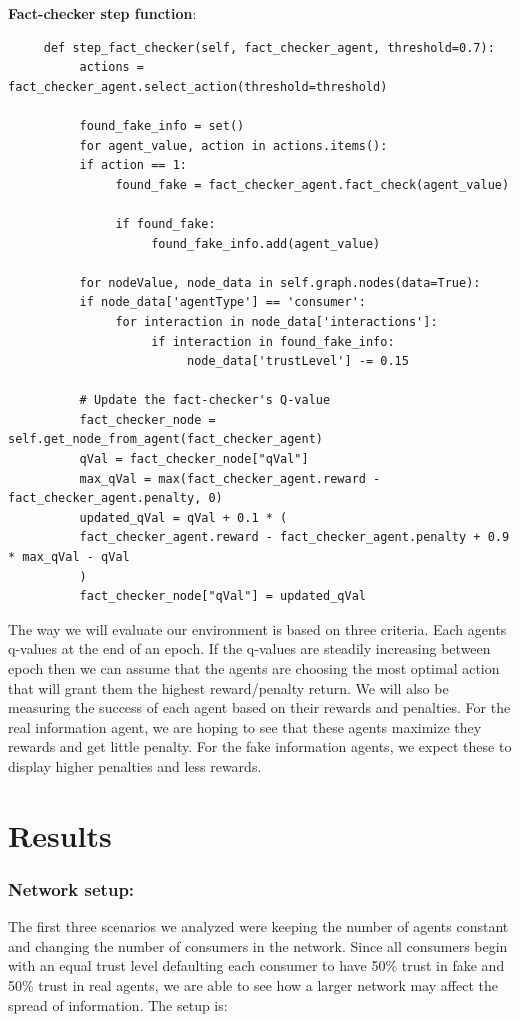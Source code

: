 \documentclass[twoside]{article}
\begin{document}
\textbf{Fact-checker step function}:

\begin{verbatim}
     def step_fact_checker(self, fact_checker_agent, threshold=0.7):
          actions = fact_checker_agent.select_action(threshold=threshold)

          found_fake_info = set()
          for agent_value, action in actions.items():
          if action == 1:
               found_fake = fact_checker_agent.fact_check(agent_value)
               
               if found_fake:
                    found_fake_info.add(agent_value)
          
          for nodeValue, node_data in self.graph.nodes(data=True):
          if node_data['agentType'] == 'consumer':
               for interaction in node_data['interactions']:
                    if interaction in found_fake_info:
                         node_data['trustLevel'] -= 0.15

          # Update the fact-checker's Q-value
          fact_checker_node = self.get_node_from_agent(fact_checker_agent)
          qVal = fact_checker_node["qVal"]
          max_qVal = max(fact_checker_agent.reward - fact_checker_agent.penalty, 0)
          updated_qVal = qVal + 0.1 * (
          fact_checker_agent.reward - fact_checker_agent.penalty + 0.9 * max_qVal - qVal
          )
          fact_checker_node["qVal"] = updated_qVal
\end{verbatim}

The way we will evaluate our environment is based on three criteria. Each agents q-values at the end of an epoch. If the q-values are steadily increasing between epoch then we can assume that the agents are choosing the most optimal action that will grant them the highest reward/penalty return. We will also be measuring the success of each agent based on their rewards and penalties. For the real information agent, we are hoping to see that these agents maximize they rewards and get little penalty. For the fake information agents, we expect these to display higher penalties and less rewards.


\section{Results}
\subsubsection{Network setup: }
The first three scenarios we analyzed were keeping the number of agents constant and changing the number of consumers in the network. Since all consumers begin with an equal trust level defaulting each consumer to have 50\% trust in fake and 50\% trust in real agents, we are able to see how a larger network may affect the spread of information. The setup is:
\end{document}

